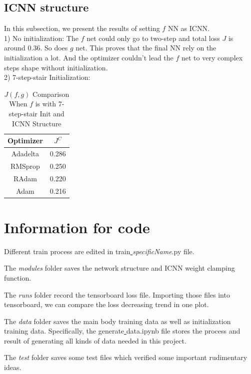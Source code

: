 \documentclass[conference,compsoc]{IEEEtran}
\begin{document}
\subsection{ICNN structure}
In this subsection, we present the results of setting $f$ NN as ICNN. \\
1) No initialization:
The $f$ net could only go to two-step and total loss $J$ is around 0.36. So does $g$ net. This proves that the final NN rely on the initialization a lot. And the optimizer couldn't lead the $f$ net to very complex steps shape without initialization.\\
2) 7-step-stair Initialization:

\begin{table}[htbp]
  \caption{$J(f,g)$ Comparison When $f$ is with 7-step-stair Init and ICNN Structure }
  \begin{center}
  \begin{tabular}{|c|c|}
  \hline
  \textbf{Optimizer}& $J^{C}$ \\
  \hline

  Adadelta & 0.286\\
  RMSprop& 0.250 \\
  RAdam & 0.220\\
  Adam & 0.216\\
  \hline
  
\end{tabular}
  \label{tab1e results}
  \end{center}
  \end{table}


\section*{Information for code}

Different train process are edited in train\underline{ }\textit{specificName}.py file. 

The \textit{modules} folder saves the network structure and ICNN weight clamping function.

The \textit{runs} folder record the tensorboard loss file. Importing those files into tensorboard, we can compare the loss decreasing trend in one plot.

The \textit{data} folder saves the main body training data as well as initialization training data. Specifically, the generate\underline{ }data.ipynb file stores the process and result of generating all kinds of data needed in this project.

The \textit{test} folder saves some test files which verified some important rudimentary ideas.
\end{document}
